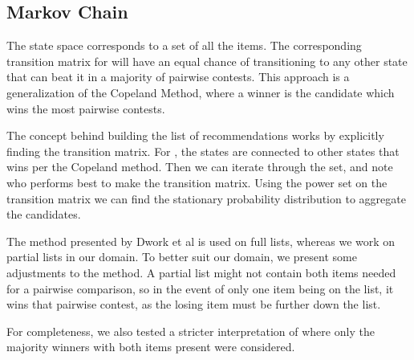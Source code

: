 \subsection{Markov Chain}\label{sec:markovchain}
The state space corresponds to a set of all the items. The corresponding transition matrix for \MC will have an equal chance of transitioning to any other state that can beat it in a majority of pairwise contests. This approach is a generalization of the Copeland Method, where a winner is the candidate which wins the most pairwise contests.

The concept behind building the list of recommendations works by explicitly finding the transition matrix. For \MC, the states are connected to other states that wins per the Copeland method. Then we can iterate through the set, and note who performs best to make the transition matrix. Using the power set on the transition matrix we can find the stationary probability distribution to aggregate the candidates.

The method presented by Dwork et al is used on full lists, whereas we work on partial lists in our domain. To better suit our domain, we present some adjustments to the method. A partial list might not contain both items needed for a pairwise comparison, so in the event of only one item being on the list, it wins that pairwise contest, as the losing item must be further down the list.

For completeness, we also tested a stricter interpretation of \MC where only the majority winners with both items present were considered.